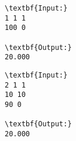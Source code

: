 \begin{verbatim}
\textbf{Input:}
1 1 1
100 0

\textbf{Output:}
20.000
\end{verbatim}
\begin{verbatim}
\textbf{Input:}
2 1 1
10 10
90 0

\textbf{Output:}
20.000\end{verbatim}